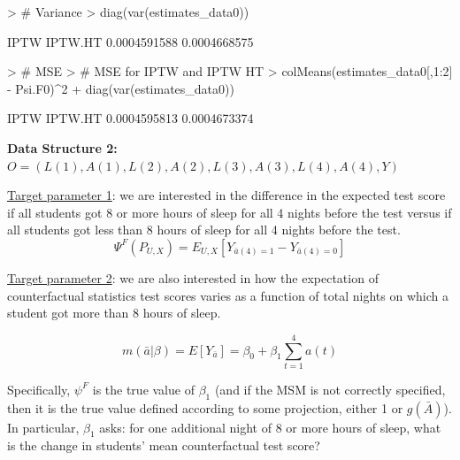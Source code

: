 \documentclass[answers]{exam}
\begin{document}
\begin{solution}
\begin{Schunk}
\begin{Sinput}
> # Variance
> diag(var(estimates_data0))
\end{Sinput}
\begin{Soutput}
        IPTW      IPTW.HT 
0.0004591588 0.0004668575 
\end{Soutput}
\end{Schunk}
\begin{Schunk}
\begin{Sinput}
> # MSE
> # MSE for IPTW and IPTW HT
> colMeans(estimates_data0[,1:2] - Psi.F0)^2 + diag(var(estimates_data0))
\end{Sinput}
\begin{Soutput}
        IPTW      IPTW.HT 
0.0004595813 0.0004673374 
\end{Soutput}
\end{Schunk}

\end{solution}


\pagebreak
\noindent\large\textbf{Data Structure 2: $O = (L(1), A(1), L(2), A(2), L(3), A(3), L(4), A(4), Y)$}
\normalsize

\noindent\underline{Target parameter 1}: we are interested in the difference in the expected test score if all students got 8 or more hours of sleep for all 4 nights before the test versus if all students got less than 8 hours of sleep for all 4 nights before the test.
\[
\Psi^F(P_{U,X}) = E_{U,X}[Y_{\bar{a}(4)=1} - Y_{\bar{a}(4)=0}]
\]

\noindent\underline{Target parameter 2}: we are also interested in how the expectation of counterfactual statistics test scores varies as a function of total nights on which a student got more than 8 hours of sleep. 

\[
m(\bar{a}|\beta) = E[Y_{\bar{a}}] = \beta_0 + \beta_1 \sum_{t=1}^4a(t)
\]

Specifically, $\psi^F$ is the true value of $\beta_1$ (and if the MSM is not correctly specified, then it is the true value defined according to some projection, either 1 or $g(\bar{A})$). In particular, $\beta_1$ asks: for one additional night of 8 or more hours of sleep, what is the change in students' mean counterfactual test score?
\end{document}
